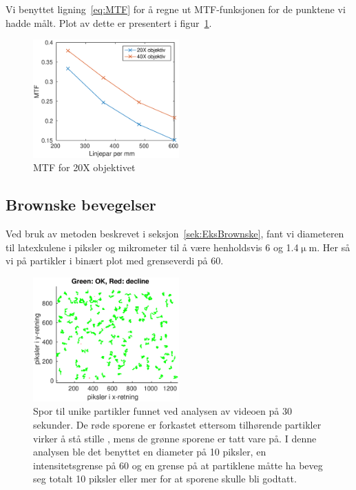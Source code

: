 \documentclass[a4paper,11pt, twocolumn]{article}
\begin{document}
Vi benyttet ligning~\eqref{eq:MTF} for å regne ut MTF-funksjonen for de punktene vi hadde målt. Plot av dette er presentert i figur~\ref{fig:MTF}. 

\begin{figure}[!ht]
	\centering
	\includegraphics[width = 0.5\textwidth]{Lab/MTF/MTF.eps}
	\caption{MTF for 20X objektivet}
	\label{fig:MTF}
\end{figure}

\subsection{Brownske bevegelser}
Ved bruk av metoden beskrevet i seksjon~\ref{sek:EksBrownske}, fant vi diameteren til latexkulene i piksler og mikrometer til å være henholdsvis 6 og 1.4$\upmu$m. Her så vi på partikler i binært plot med grenseverdi på 60.

\begin{figure}[!ht]
	\centering
	\includegraphics[width = 0.5\textwidth]{Lab/brownian-motion/Video/30sektracks}
	\caption{Spor til unike partikler funnet ved analysen av videoen på 30 sekunder. De røde sporene er forkastet ettersom tilhørende partikler virker å stå stille , mens de grønne sporene er tatt vare på. I denne analysen ble det benyttet en diameter på 10 piksler, en intensitetsgrense på 60 og en grense på at partiklene måtte ha beveg seg totalt 10 piksler eller mer for at sporene skulle bli godtatt.}
	\label{fig:30sectracks}
\end{figure}
\end{document}
